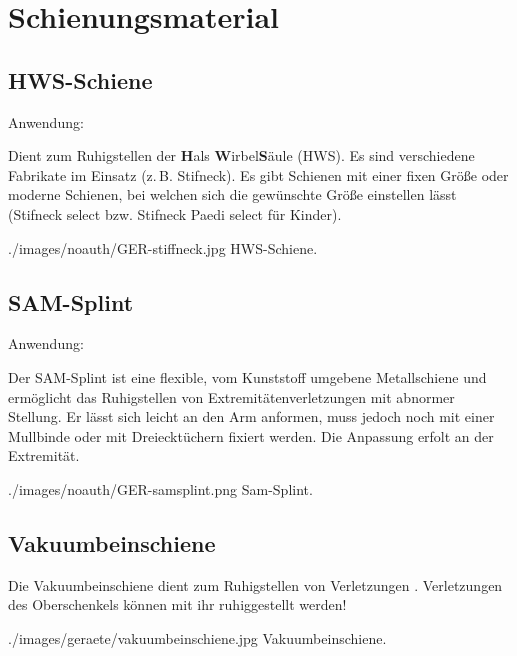    
\clearpage
\section{Schienungsmaterial}

\subsection{HWS-Schiene}
\label{topic:hws-schiene-beschreibung}

Anwendung: 
{
Dient zum Ruhigstellen der {\bfseries H}als{\bfseries
W}irbel{\bfseries S}äule (HWS). Es sind verschiedene
Fabrikate im Einsatz (z.\,B. Stifneck\texttrademark). Es gibt
Schienen mit einer fixen Größe oder moderne Schienen, bei
welchen sich die gewünschte Größe einstellen lässt
(Stifneck select{\texttrademark} bzw. Stifneck Paedi
select{\texttrademark} für Kinder).

{\TakeNotesLarge}
}{

}
{./images/noauth/GER-stiffneck.jpg}
{HWS-Schiene.}
{}




\subsection{SAM-Splint}

\label{topic:sam-splint-beschreibung}

Anwendung: 

{
Der SAM-Splint ist eine flexible, vom Kunststoff umgebene
Metallschiene und ermöglicht das Ruhigstellen von Extremitätenverletzungen mit
abnormer Stellung. Er lässt sich leicht an den Arm anformen, muss jedoch noch
mit einer Mullbinde oder mit Dreiecktüchern fixiert werden. Die Anpassung erfolt an der  Extremität. 

{\TakeNotesLarge}
}{

}
{./images/noauth/GER-samsplint.png}
{Sam-Splint.}
{}


\subsection{Vakuumbeinschiene}
\label{topic:vacuumbeinschiene-beschreibung}

{
Die Vakuumbeinschiene dient zum Ruhigstellen von Verletzungen . Verletzungen des Oberschenkels können mit ihr  ruhiggestellt
werden!

{\TakeNotesLarge}
}{

}
{./images/geraete/vakuumbeinschiene.jpg}
{\AuthNotesPicLegalOk{}{}Vakuumbeinschiene.}
{}





